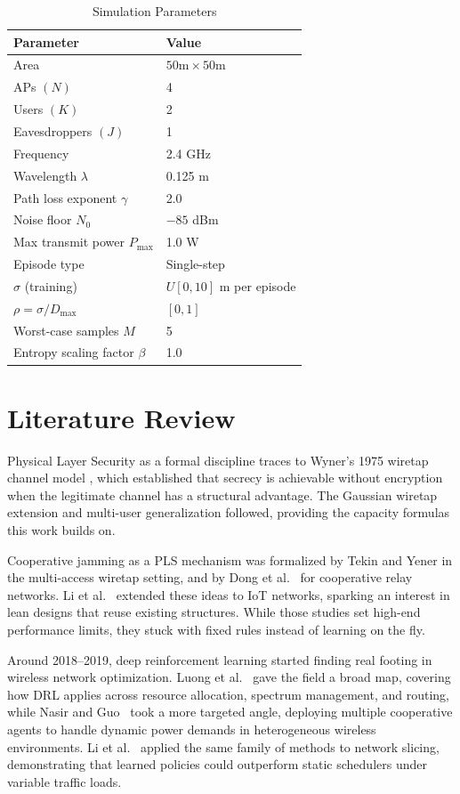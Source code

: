 \documentclass[conference]{IEEEtran}
\begin{document}
\begin{table}[t]
\caption{Simulation Parameters}
\centering
\begin{tabular}{|l|l|}
\hline
\textbf{Parameter} & \textbf{Value} \\
\hline
Area & $50\text{m} \times 50\text{m}$ \\
APs $(N)$ & 4 \\
Users $(K)$ & 2 \\
Eavesdroppers $(J)$ & 1 \\
Frequency & 2.4 GHz \\
Wavelength $\lambda$ & 0.125 m \\
Path loss exponent $\gamma$ & 2.0 \\
Noise floor $N_0$ & $-85$ dBm \\
Max transmit power $P_{\max}$ & 1.0 W \\
Episode type & Single-step \\
$\sigma$ (training) & $U[0,10]$ m per episode \\
$\rho=\sigma/D_{\max}$ & $[0,1]$ \\
Worst-case samples $M$ & 5 \\
Entropy scaling factor $\beta$ & 1.0 \\
\hline
\end{tabular}
\end{table}

\section{Literature Review}

Physical Layer Security as a formal discipline traces to Wyner's 1975 wiretap channel model \cite{wyner}, which established that secrecy is achievable without encryption when the legitimate channel has a structural advantage. The Gaussian wiretap extension \cite{gaussian} and multi-user generalization \cite{broadcast} followed, providing the capacity formulas this work builds on.

Cooperative jamming as a PLS mechanism was formalized by Tekin and Yener \cite{tekin} in the multi-access wiretap setting, and by Dong et al.~\cite{dong} for cooperative relay networks. Li et al.~\cite{iot} extended these ideas to IoT networks, sparking an interest in lean designs that reuse existing structures. While those studies set high-end performance limits, they stuck with fixed rules instead of learning on the fly.

Around 2018--2019, deep reinforcement learning started finding real footing in wireless network optimization. Luong et al.~\cite{luong} gave the field a broad map, covering how DRL applies across resource allocation, spectrum management, and routing, while Nasir and Guo~\cite{nasir} took a more targeted angle, deploying multiple cooperative agents to handle dynamic power demands in heterogeneous wireless environments. Li et al.~\cite{slice} applied the same family of methods to network slicing, demonstrating that learned policies could outperform static schedulers under variable traffic loads.
\end{document}
